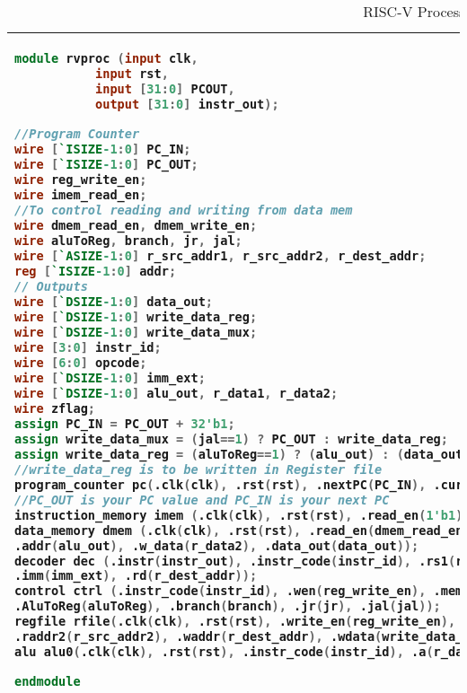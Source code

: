 \lstset{framesep=-5pt, xleftmargin=-5pt}

\begin{table}[!h]
\centering
\caption{RISC-V Processor Top Level Unit}
\label{mem.tbl}
\begin{tabular}{l}
\toprule
\begin{lstlisting}[columns=fullflexible, language=Verilog]
module rvproc (input clk,
	       input rst,
	       input [31:0] PCOUT,
	       output [31:0] instr_out);

//Program Counter
wire [`ISIZE-1:0] PC_IN;
wire [`ISIZE-1:0] PC_OUT;
wire reg_write_en;
wire imem_read_en;
//To control reading and writing from data mem
wire dmem_read_en, dmem_write_en;
wire aluToReg, branch, jr, jal;
wire [`ASIZE-1:0] r_src_addr1, r_src_addr2, r_dest_addr;
reg [`ISIZE-1:0] addr;
// Outputs
wire [`DSIZE-1:0] data_out;
wire [`DSIZE-1:0] write_data_reg;
wire [`DSIZE-1:0] write_data_mux;
wire [3:0] instr_id;
wire [6:0] opcode;
wire [`DSIZE-1:0] imm_ext;
wire [`DSIZE-1:0] alu_out, r_data1, r_data2;
wire zflag;
assign PC_IN = PC_OUT + 32'b1;
assign write_data_mux = (jal==1) ? PC_OUT : write_data_reg;
assign write_data_reg = (aluToReg==1) ? (alu_out) : (data_out); 
//write_data_reg is to be written in Register file
program_counter pc(.clk(clk), .rst(rst), .nextPC(PC_IN), .currPC(PC_OUT)); 
//PC_OUT is your PC value and PC_IN is your next PC
instruction_memory imem (.clk(clk), .rst(rst), .read_en(1'b1), .r_addr(PC_OUT), .instr_out(instr_out));
data_memory dmem (.clk(clk), .rst(rst), .read_en(dmem_read_en), .write_en(dmem_write_en), 
.addr(alu_out), .w_data(r_data2), .data_out(data_out));
decoder dec (.instr(instr_out), .instr_code(instr_id), .rs1(r_src_addr1), .rs2(r_src_addr2), 
.imm(imm_ext), .rd(r_dest_addr));
control ctrl (.instr_code(instr_id), .wen(reg_write_en), .mem_read(dmem_read_en), .mem_write(dmem_write_en), 
.AluToReg(aluToReg), .branch(branch), .jr(jr), .jal(jal));
regfile rfile(.clk(clk), .rst(rst), .write_en(reg_write_en), .raddr1(r_src_addr1), 
.raddr2(r_src_addr2), .waddr(r_dest_addr), .wdata(write_data_reg), .rdata1(r_data1), .rdata2(r_data2));
alu alu0(.clk(clk), .rst(rst), .instr_code(instr_id), .a(r_data1), .b(r_data2), .imm(imm_ext), .out(alu_out), .zero(zflag));

endmodule
\end{lstlisting}
\\
\bottomrule
\end{tabular}
\end{table}